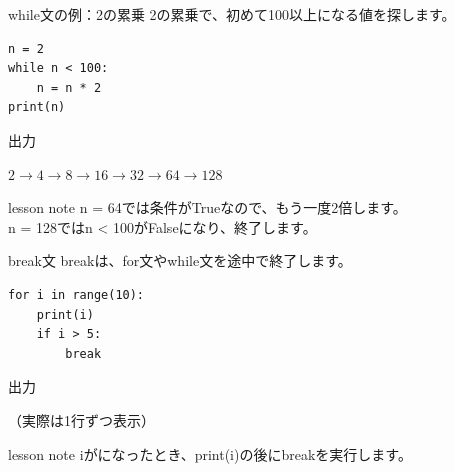 \documentclass[12pt,aspectratio=43]{beamer}
\newcommand{\code}[1]{{\codefont #1}}
\newcommand{\result}[1]{%
  \par\vspace{1mm}%
  {\small\textcolor{black!60}{出力}}\quad
  {\codefont\fontsize{16}{18}\selectfont #1}\par}
\newenvironment{lessonbox}
  {\begin{beamercolorbox}[wd=\linewidth,sep=1.5mm]{lesson note}}
  {\end{beamercolorbox}\par}
\begin{document}
\begin{frame}[t,fragile]{while文の例：2の累乗}
  \setlength{\parskip}{0pt}
  2の累乗で、初めて100以上になる値を探します。
\begin{lstlisting}
n = 2
while n < 100:
    n = n * 2
print(n)
\end{lstlisting}
  \result{128}
  \vspace{3mm}
  \begingroup\centering
    \(2 \longrightarrow 4 \longrightarrow 8 \longrightarrow 16
      \longrightarrow 32 \longrightarrow 64 \longrightarrow 128\)\par
  \endgroup
  \vspace{3mm}
  \begin{lessonbox}
    \small \code{n = 64}では条件が\code{True}なので、もう一度2倍します。\\
    \code{n = 128}では\code{n < 100}が\code{False}になり、終了します。
  \end{lessonbox}
\end{frame}

\begin{frame}[t,fragile]{break文}
  \setlength{\parskip}{0pt}
  \code{break}は、\code{for}文や\code{while}文を途中で終了します。
\begin{lstlisting}
for i in range(10):
    print(i)
    if i > 5:
        break
\end{lstlisting}
  \result{0}
  {\small （実際は1行ずつ表示）\par}
  \vspace{2mm}
  \begin{lessonbox}
    \small \code{i}が\code{6}になったとき、\code{print(i)}の後に\code{break}を実行します。
  \end{lessonbox}
\end{frame}
\end{document}
